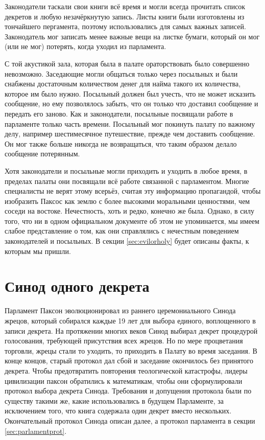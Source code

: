 \documentclass[12pt, a4paper]{article} %
\begin{document}
Законодатели таскали свои книги всё время и могли всегда прочитать список декретов и любую незачёркнутую запись. Листы книги были изготовлены из тончайшего пергамента, поэтому использовались для самых важных записей. Законодатель мог записать менее важные вещи на листке бумаги, который он мог (или не мог) потерять, когда уходил из парламента.

С той акустикой зала, которая была в палате ораторствовать было совершенно невозможно. Заседающие могли общаться только через посыльных и были снабжены достаточным количеством денег для найма такого их количества, которое им было нужно. Посыльный должен был учесть, что не может исказить сообщение, но ему позволялось забыть, что он только что доставил сообщение и передать его заново. Как и законодатели, посыльные посвящали работе в парламенте только часть времени. Посыльный мог покинуть палату по важному делу, например шестимесячное путешествие, прежде чем доставить сообщение. Он мог также больше никогда не возвращаться, что таким образом делало сообщение потерянным.

Хотя законодатели и посыльные могли приходить и уходить в любое время, в пределах палаты они посвящали всё работе связанной с парламентом. Многие специалисты не верят этому всерьёз, считая эту информацию пропагандой, чтобы изобразить Паксос как землю с более высокими моральными ценностями, чем соседи на востоке. Нечестность, хоть и редко, конечно же была. Однако, в силу того, что ни в одном официальном документе об этом не упоминается, мы имеем слабое представление о том, как они справлялись с нечестным поведением законодателей и посыльных. В секции \ref{sec:evilorholy} будет описаны факты, к которым мы пришли.

\section{Синод одного декрета}

Парламент Паксон эволюционировал из раннего церемониального Синода жрецов, который собирался каждые 19 лет для выбора единого, воплощенного в записи декрета. На протяжении многих веков Синод выбирал декрет процедурой голосования, требующей присутствия всех жрецов. Но по мере процветания торговли, жрецы стали то уходить, то приходить в Палату во время заседания. В конце концов, старый протокол дал сбой и заседание окончилось без принятого декрета. Чтобы предотвратить повторения теологической катастрофы, лидеры цивилизации паксон обратились к математикам, чтобы они сформулировали протокол выбора декрета Синода. Требования и допущения протокола были по существу такими же, какие использовались в будущем Парламенте, за исключением того, что книга содержала один декрет вместо нескольких. Окончательный протокол Синода описан далее, а протокол парламента в секции \ref{sec:parlamentprot}.
\end{document}

